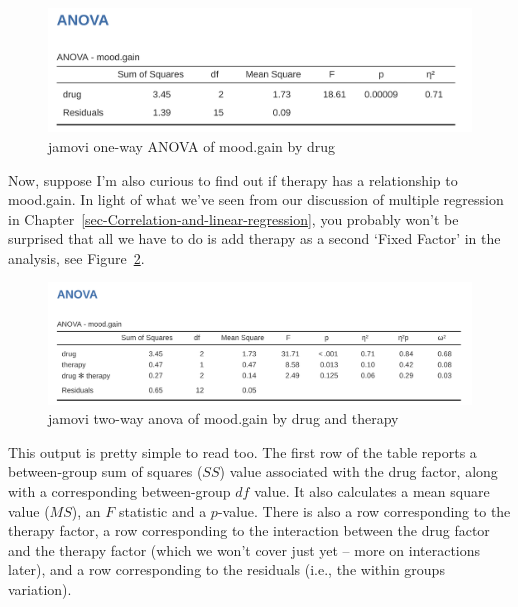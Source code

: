 \documentclass[
  a4paper,
]{book}
\begin{document}
\begin{figure}

\includegraphics[width=1\textwidth,height=\textheight]{images/fig14-2.png} \hfill{}

\caption{\label{fig-fig14-2}jamovi one-way ANOVA of mood.gain by drug}

\end{figure}

Now, suppose I'm also curious to find out if therapy has a relationship
to mood.gain. In light of what we've seen from our discussion of
multiple regression in
Chapter~\ref{sec-Correlation-and-linear-regression}, you probably won't
be surprised that all we have to do is add therapy as a second `Fixed
Factor' in the analysis, see Figure~\ref{fig-fig14-3}.

\begin{figure}

\includegraphics[width=1\textwidth,height=\textheight]{images/fig14-3.png} \hfill{}

\caption{\label{fig-fig14-3}jamovi two-way anova of mood.gain by drug
and therapy}

\end{figure}

This output is pretty simple to read too. The first row of the table
reports a between-group sum of squares (\(SS\)) value associated with
the drug factor, along with a corresponding between-group \(df\) value.
It also calculates a mean square value (\(MS\)), an \(F\) statistic and
a \(p\)-value. There is also a row corresponding to the therapy factor,
a row corresponding to the interaction between the drug factor and the
therapy factor (which we won't cover just yet -- more on interactions
later), and a row corresponding to the residuals (i.e., the within
groups variation).
\end{document}
